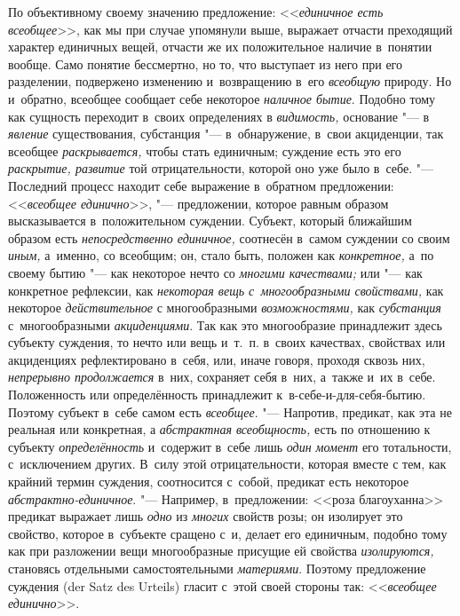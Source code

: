 По объективному своему значению предложение: <<{\em единичное есть всеобщее}>>,
как мы при случае упомянули выше, выражает отчасти преходящий характер
единичных вещей, отчасти же их положительное наличие в~понятии вообще. Само
понятие бессмертно, но то, что выступает из него при его разделении, подвержено
изменению и~возвращению в~его {\em всеобщую} природу. Но и~обратно, всеобщее
сообщает себе некоторое {\em наличное бытие}. Подобно тому как сущность
переходит в~своих определениях в {\em видимость,} основание "---
в {\em явление} существования, субстанция "--- в~обнаружение, в~свои
акциденции, так всеобщее {\em раскрывается,} чтобы стать единичным; суждение
есть это его {\em раскрытие, развитие} той отрицательности, которой оно
уже было в~себе. "--- Последний процесс находит себе выражение в~обратном
предложении: <<{\em всеобщее единично}>>, "--- предложении, которое равным
образом высказывается в~положительном суждении. Субъект, который ближайшим
образом есть {\em непосредственно единичное,} соотнесён в~самом суждении со
своим {\em иным,} а~именно, со всеобщим; он, стало быть, положен как
{\em конкретное,} а~по своему бытию "--- как некоторое нечто со
{\em многими качествами;} или "--- как конкретное рефлексии, как {\em некоторая
вещь с~многообразными свойствами,} как некоторое {\em действительное}
с многообразными {\em возможностями,} как {\em субстанция} с~многообразными
{\em акциденциями}. Так как это многообразие принадлежит здесь субъекту
суждения, то нечто или вещь и~т.~п. в~своих качествах, свойствах или
акциденциях рефлектировано в~себя, или, иначе говоря, проходя сквозь них,
{\em непрерывно продолжается} в~них, сохраняет себя в~них, а~также и~их в~себе.
Положенность или определённость принадлежит к~в-себе-и-для-себя-бытию. Поэтому
субъект в~себе самом есть {\em всеобщее}. "--- Напротив, предикат, как эта не
реальная или конкретная, а {\em абстрактная всеобщность,} есть по отношению к
субъекту {\em определённость} и~содержит в~себе лишь {\em один момент} его
тотальности, с~исключением других. В~силу этой отрицательности, которая вместе
с тем, как крайний термин суждения, соотносится с~собой, предикат есть
некоторое {\em абстрактно-единичное}. "--- Например, в~предложении: <<роза
благоуханна>> предикат выражает лишь {\em одно} из {\em многих} свойств розы;
он изолирует это свойство, которое в~субъекте сращено с~и, делает его
единичным, подобно тому как при разложении вещи многообразные присущие ей
свойства {\em изолируются,} становясь отдельными самостоятельными
{\em материями}. Поэтому предложение суждения (der Satz des
Urteils) гласит с~этой своей стороны так: <<{\em всеобщее единично}>>.

